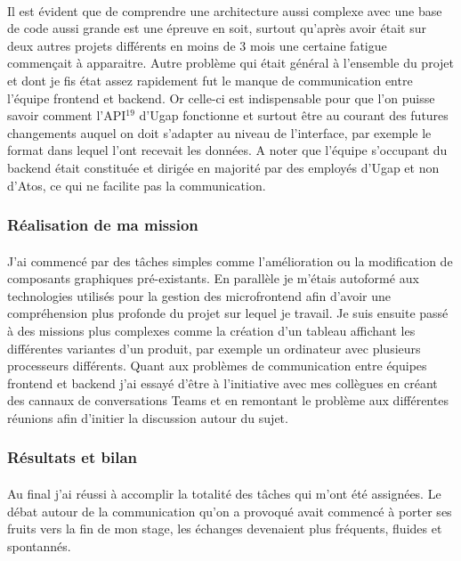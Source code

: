 \documentclass[12pt]{article}
\begin{document}
\begin {sloppypar}
\paragraph{}
Il est évident que de comprendre une architecture aussi complexe avec une base de code aussi grande 
est une épreuve en soit, surtout qu'après avoir était sur deux autres projets différents en moins de 3 mois
une certaine fatigue commençait à apparaitre. Autre problème qui était général à l'ensemble du projet
et dont je fis état assez rapidement fut le manque de communication entre l'équipe frontend et backend. 
Or celle-ci est indispensable pour que l'on puisse savoir comment l'API$^{19}$ d'Ugap fonctionne et
surtout être au courant des futures changements auquel on doit s'adapter au niveau de l'interface,
par exemple le format dans lequel l'ont recevait les données. A noter que l'équipe s'occupant du 
backend était constituée et dirigée en majorité par des employés d'Ugap et non d'Atos, ce qui ne 
facilite pas la communication.
\subsubsection{Réalisation de ma mission}
\paragraph{}
J'ai commencé par des tâches simples comme l'amélioration ou la modification de composants graphiques
pré-existants. En parallèle je m'étais autoformé aux technologies utilisés pour la gestion des microfrontend 
afin d'avoir une compréhension plus profonde du projet sur lequel je travail. Je suis ensuite passé à des missions 
plus complexes comme la création d'un tableau affichant les différentes variantes d'un produit, par exemple
un ordinateur avec plusieurs processeurs différents. Quant aux problèmes de communication entre équipes frontend 
et backend j'ai essayé d'être à l'initiative avec mes collègues en créant des cannaux de conversations Teams 
et en remontant le problème aux différentes réunions afin d'initier la discussion autour du sujet.

\subsubsection{Résultats et bilan}
\paragraph{}
Au final j'ai réussi à accomplir la totalité des tâches qui m'ont été assignées. Le débat autour de la communication 
qu'on a provoqué avait commencé à porter ses fruits vers la fin de mon stage, les échanges devenaient plus 
fréquents, fluides et spontannés. 

\end{sloppypar}
\end{document}
